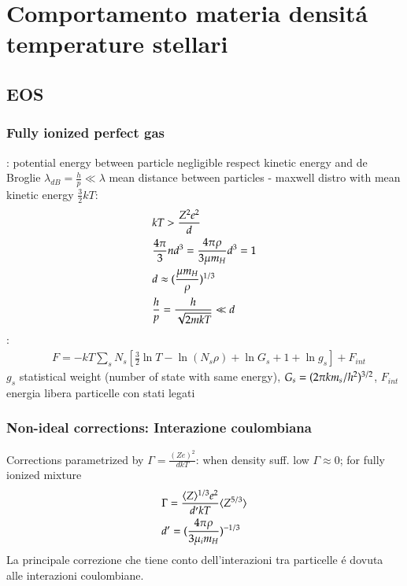 \documentclass[main.tex]{subfiles}
\begin{document}
\chapter{Comportamento materia densit\'a temperature stellari}
\PartialToc

\section{EOS}

\subsection{Fully ionized perfect gas}

: potential energy between particle negligible respect kinetic energy and de Broglie $\lambda_{dB}=\frac{h}{p}\ll\lambda$ mean distance between particles - maxwell distro with mean kinetic energy $\frac{3}{2}kT$:
\begin{align*}
&kT>\frac{Z^2e^2}{d}\\
&\frac{4\pi}{3}nd^3=\frac{4\pi\rho}{3\mu m_H}d^3=1\\
&d\approx(\frac{\mu m_H}{\rho})^{1/3}\\
&\frac{h}{p}=\frac{h}{\sqrt{2mkT}}\ll d
\end{align*}
:
\begin{align*}
&F=-kT\sum_sN_s[\frac{3}{2}\ln{T}-\ln{(N_s\rho)}+\ln{G_s}+1+\ln{g_s}]+F_{int}
\end{align*}
$g_s$ statistical weight (number of state with same energy), $G_s=(2\pi km_s/h^2)^{3/2}$, $F_{int}$ energia libera particelle con stati legati

\subsection{Non-ideal corrections: Interazione coulombiana}

Corrections parametrized by $\Gamma=\frac{(Ze)^2}{dkT}$: when density suff. low $\Gamma\approx0$; for fully ionized mixture
\begin{align*}
&\Gamma=\frac{\langle Z \rangle^{1/3}e^2}{d'kT}\langle Z^{5/3} \rangle\\
&d'=(\frac{4\pi\rho}{3\mu_im_H})^{-1/3}
\end{align*}
La principale correzione che tiene conto dell'interazioni tra particelle \'e dovuta alle interazioni coulombiane.

\begin{workout}

\end{workout}
\end{document}
